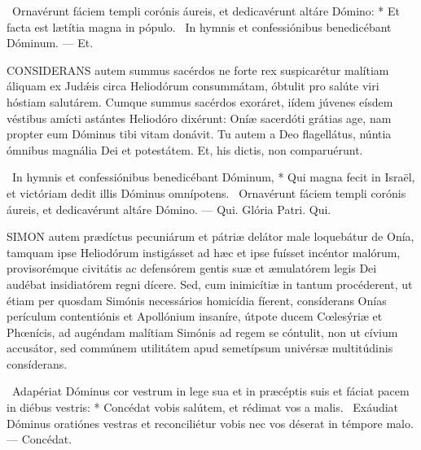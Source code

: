 \R\ Ornavérunt fáciem templi corónis áureis, et dedicavérunt altáre Dómino: * Et facta est lætítia magna in pópulo. \V\ In hymnis et confessiónibus benedicébant Dóminum. — Et.



\lettrine[lines=2]{C}{ONSIDERANS} autem summus sacérdos ne forte rex suspicarétur malítiam áliquam ex Judǽis circa Heliodórum consummátam, óbtulit pro salúte viri hóstiam salutárem. Cumque summus sacérdos exoráret, iídem júvenes eísdem véstibus amícti astántes Heliodóro dixérunt: Oníæ sacerdóti grátias age, nam propter eum Dóminus tibi vitam donávit. Tu autem a Deo flagellátus, núntia ómnibus magnália Dei et potestátem. Et, his dictis, non comparuérunt.

\R\ In hymnis et confessiónibus benedicébant Dóminum, * Qui magna fecit in Israël, et victóriam dedit illis Dóminus omnípotens. \V\ Ornavérunt fáciem templi corónis áureis, et dedicavérunt altáre Dómino. — Qui. Glória Patri. Qui.





\lettrine[lines=2]{S}{IMON} autem prædíctus pecuniárum et pátriæ delátor male loquebátur de Onía, tamquam ipse Heliodórum instigásset ad hæc et ipse fuísset incéntor malórum, provisorémque civitátis ac defensórem gentis suæ et æmulatórem legis Dei audébat insidiatórem regni dícere. Sed, cum inimicítiæ in tantum procéderent, ut étiam per quosdam Simónis necessários homicídia fíerent, consíderans Onías perículum contentiónis et Apollónium insaníre, útpote ducem Cœlesýriæ et Phœnícis, ad augéndam malítiam Simónis ad regem se cóntulit, non ut cívium accusátor, sed commúnem utilitátem apud semetípsum univérsæ multitúdinis consíderans.

\R\ Adapériat Dóminus cor vestrum in lege sua et in præcéptis suis et fáciat pacem in diébus vestris: * Concédat vobis salútem, et rédimat vos a malis. \V\ Exáudiat Dóminus oratiónes vestras et reconciliétur vobis nec vos déserat in témpore malo. — Concédat.

